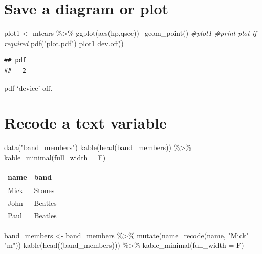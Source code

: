 \documentclass[
]{book}
\newenvironment{Shaded}{\begin{snugshade}}{\end{snugshade}}
\newcommand{\AttributeTok}[1]{\textcolor[rgb]{0.77,0.63,0.00}{#1}}
\newcommand{\CommentTok}[1]{\textcolor[rgb]{0.56,0.35,0.01}{\textit{#1}}}
\newcommand{\FunctionTok}[1]{\textcolor[rgb]{0.00,0.00,0.00}{#1}}
\newcommand{\NormalTok}[1]{#1}
\newcommand{\OtherTok}[1]{\textcolor[rgb]{0.56,0.35,0.01}{#1}}
\newcommand{\SpecialCharTok}[1]{\textcolor[rgb]{0.00,0.00,0.00}{#1}}
\newcommand{\StringTok}[1]{\textcolor[rgb]{0.31,0.60,0.02}{#1}}
\begin{document}
\hypertarget{save-a-diagram-or-plot}{%
\section{Save a diagram or plot}\label{save-a-diagram-or-plot}}

\begin{Shaded}
\begin{Highlighting}[]
\NormalTok{plot1 }\OtherTok{\textless{}{-}}\NormalTok{ mtcars }\SpecialCharTok{\%\textgreater{}\%} \FunctionTok{ggplot}\NormalTok{(}\FunctionTok{aes}\NormalTok{(hp,qsec))}\SpecialCharTok{+}\FunctionTok{geom\_point}\NormalTok{()}
\CommentTok{\#plot1 \#print plot if required}
\FunctionTok{pdf}\NormalTok{(}\StringTok{"plot.pdf"}\NormalTok{)}
\NormalTok{plot1}
\FunctionTok{dev.off}\NormalTok{()}
\end{Highlighting}
\end{Shaded}

\begin{verbatim}
## pdf 
##   2
\end{verbatim}

pdf `device' off.

\hypertarget{recode-a-text-variable}{%
\section{Recode a text variable}\label{recode-a-text-variable}}

\begin{Shaded}
\begin{Highlighting}[]
\FunctionTok{data}\NormalTok{(}\StringTok{"band\_members"}\NormalTok{)}
\FunctionTok{kable}\NormalTok{(}\FunctionTok{head}\NormalTok{(band\_members)) }\SpecialCharTok{\%\textgreater{}\%} \FunctionTok{kable\_minimal}\NormalTok{(}\AttributeTok{full\_width =}\NormalTok{ F)}
\end{Highlighting}
\end{Shaded}

\begin{table}
\centering
\begin{tabular}{l|l}
\hline
name & band\\
\hline
Mick & Stones\\
\hline
John & Beatles\\
\hline
Paul & Beatles\\
\hline
\end{tabular}
\end{table}

\begin{Shaded}
\begin{Highlighting}[]
\NormalTok{band\_members }\OtherTok{\textless{}{-}}\NormalTok{ band\_members }\SpecialCharTok{\%\textgreater{}\%} \FunctionTok{mutate}\NormalTok{(}\AttributeTok{name=}\FunctionTok{recode}\NormalTok{(name, }\StringTok{"Mick"}\OtherTok{=} \StringTok{"m"}\NormalTok{))}
\FunctionTok{kable}\NormalTok{(}\FunctionTok{head}\NormalTok{((band\_members))) }\SpecialCharTok{\%\textgreater{}\%} \FunctionTok{kable\_minimal}\NormalTok{(}\AttributeTok{full\_width =}\NormalTok{ F)}
\end{Highlighting}
\end{Shaded}
\end{document}
